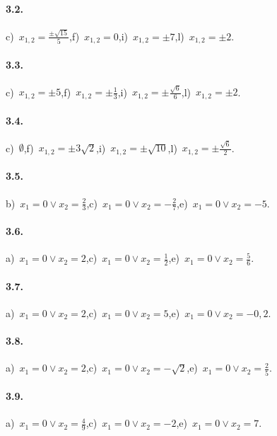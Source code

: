 \paragraph{3.2.} c)~$x_{1,2} = \frac{\pm \sqrt{15}}{5}$,\quad f)~$x_{1,2} = 0$,\quad i)~$x_{1,2} = \pm 7$,\quad l)~$x_{1,2} = \pm 2$.

\paragraph{3.3.} c)~$x_{1,2} = \pm 5$,\quad f)~$x_{1,2} = \pm \frac{1}{3}$,\quad i)~$x_{1,2} = \pm \frac{\sqrt{6}}{6}$,\quad l)~$x_{1,2} = \pm 2$.

\paragraph{3.4.} c)~$\emptyset$,\quad f)~$x_{1,2} = \pm 3 \sqrt{2}$,\quad i)~$x_{1,2} = \pm \sqrt{10}$,\quad l)~$x_{1,2} = \pm \frac{\sqrt{6}}{2}$.

\paragraph{3.5.} b)~$x_{1} = 0 \vee x_{2} = \frac{2}{3}$,\quad c)~$x_{1} = 0 \vee x_{2} = - \frac{2}{7}$,\quad e)~$x_{1} = 0 \vee x_{2} = - 5$.

\paragraph{3.6.} a)~$x_{1} = 0 \vee x_{2} = 2$,\quad c)~$x_{1} = 0 \vee x_{2} = \frac{1}{2}$,\quad e)~$x_{1} = 0 \vee x_{2} = \frac{5}{6}$.

\paragraph{3.7.} a)~$x_{1} = 0 \vee x_{2} = 2$,\quad c)~$x_{1} = 0 \vee x_{2} = 5$,\quad e)~$x_{1} = 0 \vee x_{2} = - 0,2$.

\paragraph{3.8.} a)~$x_{1} = 0 \vee x_{2} = 2$,\quad c)~$x_{1} = 0 \vee x_{2} = - \sqrt{2}$,\quad e)~$x_{1} = 0 \vee x_{2} = \frac{2}{5}$.

\paragraph{3.9.} a)~$x_{1} = 0 \vee x_{2} = \frac{4}{9}$,\quad c)~$x_{1} = 0 \vee x_{2} = - 2$,\quad e)~$x_{1} = 0 \vee x_{2} = 7$.

